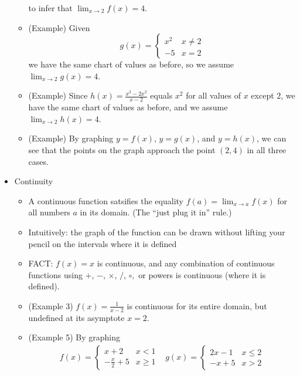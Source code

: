 \documentclass[11pt]{article}
\begin{document}
\begin{itemize}
\begin{itemize}
          to infer that \(\lim_{x\to 2} f(x)=4\).
    \item (Example) Given
      \[
        g(x)
          =
        \left\{
        \begin{matrix}
          x^2 & x\not= 2 \\
          -5 & x=2
        \end{matrix}
        \right.
      \]
          we have the same chart of values as before, so we assume
          \(\lim_{x\to 2} g(x)=4\).
    \item (Example) Since \(h(x)=\frac{x^3-2x^2}{x-2}\) equals \(x^2\) for
      all values of \(x\) except \(2\), we have the same chart of values
      as before, and we assume \(\lim_{x\to 2} h(x)=4\).
    \item (Example) By graphing \(y=f(x)\), \(y=g(x)\), and \(y=h(x)\),
      we can see that the points on the graph approach the point \((2,4)\)
      in all three cases.
  \end{itemize}
\item Continuity
  \begin{itemize}
    \item A continuous function satsifies the equality \(f(a)=\lim_{x\to a}f(x)\)
    for all numbers \(a\) in its domain. (The ``just plug it in'' rule.)
    \item Intuitively: the graph of the function can be drawn without lifting
    your pencil on the intervals where it is defined
    \item FACT: \(f(x)=x\) is continuous, and any combination of continuous
    functions using \(+\), \(-\), \(\times\), \(/\), \(\circ,\) or powers is
    continuous (where it is defined).
    \item (Example 3) \(f(x)=\frac{1}{x-2}\) is continuous for its entire
    domain, but undefined at its asymptote \(x=2\).
    \item (Example 5) By graphing
      \[
        \begin{matrix}
        f(x)
          =
        \left\{
        \begin{matrix}
          x+2 & x < 1 \\
          -\frac{x}{2}+5 & x\geq 1
        \end{matrix}
        \right.
          &
        g(x)
          =
        \left\{
        \begin{matrix}
          2x-1 & x\leq 2 \\
          -x+5 & x>2
        \end{matrix}
        \right.

\end{matrix}\]
\end{itemize}
\end{itemize}
\end{document}

